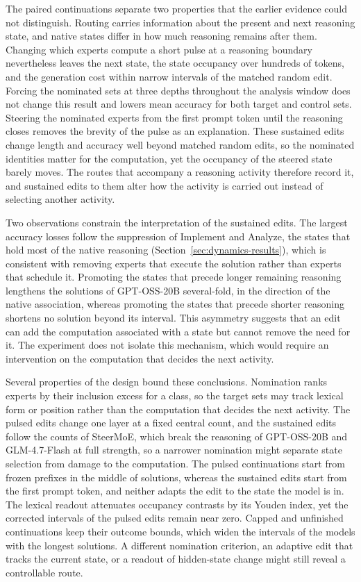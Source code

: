 The paired continuations separate two properties that the earlier evidence could not distinguish.
%
Routing carries information about the present and next reasoning state, and native states differ in how much reasoning remains after them.
%
Changing which experts compute a short pulse at a reasoning boundary nevertheless leaves the next state, the state occupancy over hundreds of tokens, and the generation cost within narrow intervals of the matched random edit.
%
Forcing the nominated sets at three depths throughout the analysis window does not change this result and lowers mean accuracy for both target and control sets.
%
Steering the nominated experts from the first prompt token until the reasoning closes removes the brevity of the pulse as an explanation.
%
These sustained edits change length and accuracy well beyond matched random edits, so the nominated identities matter for the computation, yet the occupancy of the steered state barely moves.
%
The routes that accompany a reasoning activity therefore record it, and sustained edits to them alter how the activity is carried out instead of selecting another activity.
%

Two observations constrain the interpretation of the sustained edits.
%
The largest accuracy losses follow the suppression of Implement and Analyze, the states that hold most of the native reasoning (Section~\ref{sec:dynamics-results}), which is consistent with removing experts that execute the solution rather than experts that schedule it.
%
Promoting the states that precede longer remaining reasoning lengthens the solutions of GPT-OSS-20B several-fold, in the direction of the native association, whereas promoting the states that precede shorter reasoning shortens no solution beyond its interval.
%
This asymmetry suggests that an edit can add the computation associated with a state but cannot remove the need for it.
%
The experiment does not isolate this mechanism, which would require an intervention on the computation that decides the next activity.
%

Several properties of the design bound these conclusions.
%
Nomination ranks experts by their inclusion excess for a class, so the target sets may track lexical form or position rather than the computation that decides the next activity.
%
The pulsed edits change one layer at a fixed central count, and the sustained edits follow the counts of SteerMoE, which break the reasoning of GPT-OSS-20B and GLM-4.7-Flash at full strength, so a narrower nomination might separate state selection from damage to the computation.
%
The pulsed continuations start from frozen prefixes in the middle of solutions, whereas the sustained edits start from the first prompt token, and neither adapts the edit to the state the model is in.
%
The lexical readout attenuates occupancy contrasts by its Youden index, yet the corrected intervals of the pulsed edits remain near zero.
%
Capped and unfinished continuations keep their outcome bounds, which widen the intervals of the models with the longest solutions.
%
A different nomination criterion, an adaptive edit that tracks the current state, or a readout of hidden-state change might still reveal a controllable route.
%

